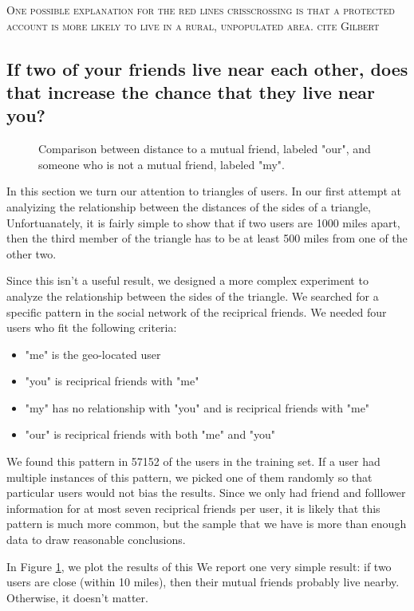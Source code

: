 \documentclass{sig-alternate}
\begin{document}
\textsc{One possible explanation for the red lines crisscrossing is that a
protected account is more likely to live in a rural, unpopulated area. cite
Gilbert}

\subsection{If two of your friends live near each other, does that increase the chance that they live near you?}
\begin{figure}
\centering
{}
\caption{
Comparison between distance to a mutual friend, labeled "our", and someone who is not a mutual friend, labeled "my".
}
\label{fig:NearTriads}
\end{figure}
In this section we turn our attention to triangles of users.
In our first attempt at analyizing the relationship between the distances of the sides of a triangle, 
Unfortuanately, it is fairly simple to show that if two users are 1000 miles apart, then the third member of the triangle has to be at least 500 miles from one of the other two.

Since this isn't a useful result, we designed a more complex experiment to analyze the relationship between the sides of the triangle.
We searched for a specific pattern in the social network of the reciprical friends.  We needed four users who fit the following criteria:
\begin{itemize}
\item "me" is the geo-located user
\item "you" is reciprical friends with "me"
\item "my" has no relationship with "you" and is reciprical friends with "me"
\item "our" is reciprical friends with both "me" and "you"
\end{itemize}

We found this pattern in 57152 of the users in the training set. If a user had multiple instances of this pattern, we picked one of them randomly so that particular users would not bias the results.
Since we only had friend and folllower information for at most seven reciprical friends per user, it is likely that this pattern is much more common, but the sample that we have is more than enough data to draw reasonable conclusions.

In Figure \ref{fig:NearTriads}, we plot the results of this 
We report one very simple result: if two users are close (within 10 miles),
then their mutual friends probably live nearby.  Otherwise, it doesn't matter.
\end{document}
